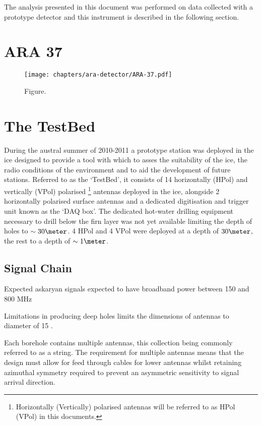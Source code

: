 The analysis presented in this document was performed on data collected with a prototype detector and this instrument is described in the following section. 




\section{ARA 37}
\label{sec:ara-detector:ARA37}

\begin{figure}[htpb]
  \centering
  \texttt{[image: chapters/ara-detector/ARA-37.pdf]}
  \caption{Figure.}
  \label{fig:ara-detector:ARA-37:ARA-37}
\end{figure}


\section{The TestBed}
\label{sec:ara-detector:TestBed}

During the austral summer of 2010-2011 a prototype station was deployed in the ice designed to provide a tool with which to asses the suitability of the ice, the radio conditions of the environment and to aid the development of future stations. Referred to as the `TestBed', it consists of 14 horizontally (HPol) and vertically (VPol) polarised \footnote{Horizontally (Vertically) polarised antennas will be referred to as HPol (VPol) in this documents.} antennas deployed in the ice, alongside 2 horizontally polarised surface antennas and a dedicated digitisation and trigger unit known as the `DAQ box'. The dedicated hot-water drilling equipment necessary to drill below the firn layer was not yet available limiting the depth of holes to $\sim 30 \meter$. 4 HPol and 4 VPol were deployed at a depth of $30 \meter$, the rest to a depth of $\sim 1 \meter$. 

\subsection{Signal Chain}
\label{sec:ara-detector:TestBed:Signal-Chain}

Expected askaryan signals expected to have broadband power between 150 and 800 MHz

Limitations in producing deep holes limits the dimensions of antennas to diameter of 15 \centi \meter. 

Each borehole contains multiple antennas, this collection being commonly referred to as a string. The requirement for multiple antennas means that the design must allow for feed through cables for lower antennas whilst retaining azimuthal symmetry required to prevent an asymmetric sensitivity to signal arrival direction.

